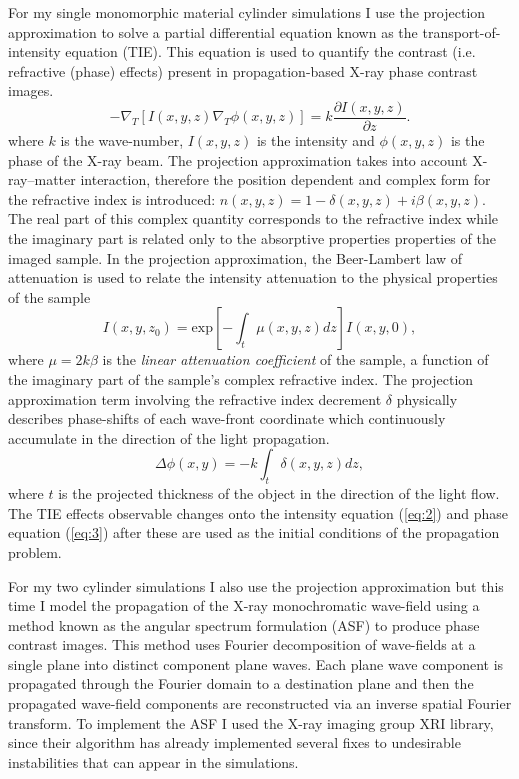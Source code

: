 \documentclass[9pt, a4paper]{article}
\begin{document}
For my single monomorphic material cylinder simulations I use the projection approximation to solve a partial differential equation known as the transport-of-intensity equation (TIE). This equation is used to quantify the contrast (i.e. refractive (phase) effects) present in propagation-based X-ray phase contrast images\cite{PagsTutes}.
\begin{equation}\label{eq:1}
-\nabla_{T} [I(x, y, z) \nabla_{T} \phi(x, y, z)] = k \frac{\partial I (x, y, z)}{\partial z}.
\end{equation}
where $k$ is the wave-number, $I(x, y, z)$ is the intensity and $\phi(x, y, z)$ is the phase of the X-ray beam.
The projection approximation takes into account X-ray--matter interaction, therefore the position dependent and complex form for the refractive index is introduced: $n(x, y, z) = 1 - \delta(x, y, z) + i \beta(x, y, z)$. The real part of this complex quantity corresponds to the refractive index while the imaginary part is related only to the absorptive properties  properties of the imaged sample\cite{PagsTutes}.
In the projection approximation, the Beer-Lambert law of attenuation is used to relate the intensity attenuation to the physical properties of the sample
\begin{equation}\label{eq:2}
I(x, y, z_0) = \mathrm{exp}[-\int_{t} \mu(x, y, z) dz] I(x, y, 0),
\end{equation}
where $\mu = 2k\beta$ is the \textit{linear attenuation coefficient} of the sample, a function of the imaginary part of the sample's complex refractive index.
The projection approximation term involving the refractive index decrement $\delta$ physically describes phase-shifts of each wave-front coordinate which continuously accumulate in the direction of the light propagation.
\begin{equation}\label{eq:3}
\Delta \phi(x, y) = -k \int_{t}\delta(x, y, z)dz,
\end{equation}
where $t$ is the projected thickness of the object in the direction of the light flow.
The TIE effects observable changes onto the intensity equation (\ref{eq:2}) and phase equation (\ref{eq:3}) after these are used as the initial conditions of the propagation problem.

For my two cylinder simulations I also use the projection approximation but this time I model the propagation of the X-ray monochromatic wave-field using a method known as the angular spectrum formulation (ASF) to produce phase contrast images. This method uses Fourier decomposition of wave-fields at a single plane into distinct component plane waves. Each plane wave component is propagated through the Fourier domain to a destination plane and then the propagated wave-field components are reconstructed via an inverse spatial Fourier transform\cite{Goodman}. To implement the ASF I used the X-ray imaging group XRI library, since their algorithm has already implemented several fixes to undesirable instabilities that can appear in the simulations. 
\end{document}
